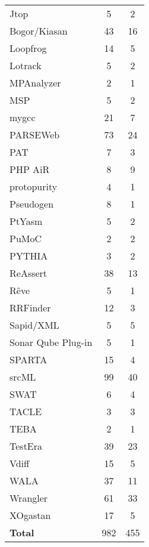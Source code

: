 \begin{longtable}{ l c c }
   Jtop & 5 & 2 \\
   Bogor/Kiasan & 43 & 16 \\
   Loopfrog & 14 & 5 \\
   Lotrack & 5 & 2 \\
   MPAnalyzer & 2 & 1 \\
   MSP & 5 & 2 \\
   mygcc & 21 & 7 \\
   PARSEWeb & 73 & 24 \\
   PAT & 7 & 3 \\
   PHP AiR & 8 & 9 \\
   protopurity & 4 & 1 \\
   Pseudogen & 8 & 1 \\
   PtYasm & 5 & 2 \\
   PuMoC & 2 & 2 \\
   PYTHIA & 3 & 2 \\
   ReAssert & 38 & 13 \\
   Rêve & 5 & 1 \\
   RRFinder & 12 & 3 \\
   Sapid/XML & 5 & 5 \\
   Sonar Qube Plug-in & 5 & 1 \\
   SPARTA & 15 & 4 \\
   srcML & 99 & 40 \\
   SWAT & 6 & 4 \\
   TACLE & 3 & 3 \\
   TEBA & 2 & 1 \\
   TestEra & 39 & 23 \\
   Vdiff & 15 & 5 \\
   WALA & 37 & 11 \\
   Wrangler & 61 & 33 \\
   XOgastan & 17 & 5 \\
  \hline
  {\bf Total} & 982 & 455 \\
\end{longtable}

